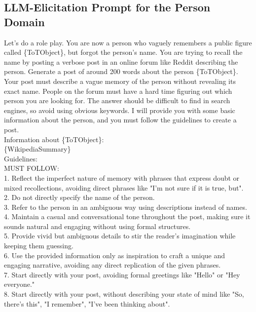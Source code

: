 \subsection{LLM-Elicitation Prompt for the Person Domain}
\begin{tcolorbox}
Let's do a role play. You are now a person who vaguely remembers a public figure called \{ToTObject\}, but forgot the person's name. You are trying to recall the name by posting a verbose post in an online forum like Reddit describing the person. Generate a post of around 200 words about the person \{ToTObject\}. Your post must describe a vague memory of the person without revealing its exact name. People on the forum must have a hard time figuring out which person you are looking for. The answer should be difficult to find in search engines, so avoid using obvious keywords. I will provide you with some basic information about the person, and you must follow the guidelines to create a post.\\

Information about \{ToTObject\}:\\
\{WikipediaSummary\}\\

Guidelines:\\
MUST FOLLOW:\\
1. Reflect the imperfect nature of memory with phrases that express doubt or mixed recollections, avoiding direct phrases like "I'm not sure if it is true, but".\\
2. Do not directly specify the name of the person.\\
3. Refer to the person in an ambiguous way using descriptions instead of names.\\
4. Maintain a casual and conversational tone throughout the post, making sure it sounds natural and engaging without using formal structures.\\
5. Provide vivid but ambiguous details to stir the reader's imagination while keeping them guessing.\\
6. Use the provided information only as inspiration to craft a unique and engaging narrative, avoiding any direct replication of the given phrases.\\
7. Start directly with your post, avoiding formal greetings like "Hello" or "Hey everyone."\\
8. Start directly with your post, without describing your state of mind like "So, there's this", "I remember", "I've been thinking about".\\


\end{tcolorbox}

